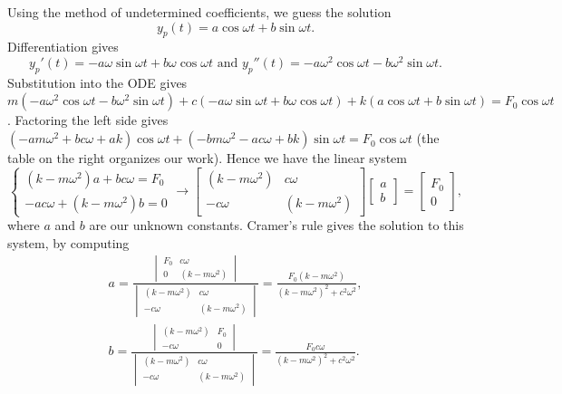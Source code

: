 Using the method of undetermined coefficients, we guess the solution 
$$y_p(t) = a\cos\omega t+b\sin\omega t. $$  
Differentiation gives 
$$y_p'(t) = -a\omega\sin\omega t+b\omega\cos\omega t \text{ and } y_p''(t) = -a\omega^2\cos\omega t-b\omega^2\sin\omega t.$$  Substitution into the ODE gives
$m(-a\omega^2\cos\omega t-b\omega^2\sin\omega t)+c(-a\omega\sin\omega t+b\omega\cos\omega t)+k(a\cos\omega t+b\sin\omega t)=F_0\cos \omega t$. Factoring the left side gives $(-am\omega^2+bc\omega+ak)\cos\omega t+(-bm\omega^2-ac\omega+bk)\sin\omega t=F_0\cos \omega t$ (the table on the right organizes our work). Hence we have the linear system 
$$\begin{cases}
(k-m\omega^2)a+bc\omega = F_0\\
-ac\omega+(k-m\omega^2)b=0
\end{cases} \rightarrow
\begin{bmatrix}
(k-m\omega^2)&c\omega\\
-c\omega& (k-m\omega^2)
\end{bmatrix}
\begin{bmatrix}
a\\b
\end{bmatrix}
=\begin{bmatrix}
F_0\\0
\end{bmatrix}
,$$ where $a$ and $b$ are our unknown constants. Cramer's rule gives the solution to this system, by computing
\begin{align*}
a=\frac{\begin{vmatrix}F_0&c\omega\\
0& (k-m\omega^2)
\end{vmatrix}}{\begin{vmatrix}(k-m\omega^2)&c\omega\\
-c\omega& (k-m\omega^2)
\end{vmatrix}}=\frac{F_0(k-m\omega^2)}{(k-m\omega^2)^2+c^2\omega^2},
\\ 
b=\frac{\begin{vmatrix}(k-m\omega^2)&F_0\\
-c\omega& 0
\end{vmatrix}}{\begin{vmatrix}(k-m\omega^2)&c\omega\\
-c\omega& (k-m\omega^2)
\end{vmatrix}}=\frac{F_0 c\omega }{(k-m\omega^2)^2+c^2\omega^2}.
\end{align*}
